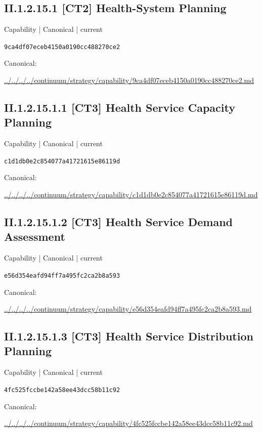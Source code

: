 \documentclass[10pt,a4paper]{article}
\begin{document}
\subsection*{II.1.2.15.1 [CT2] Health-System Planning}
\label{element-9ca4df07eceb4150a0190cc488270ce2}
{\small Capability | Canonical | current}\par
\texttt{9ca4df07eceb4150a0190cc488270ce2}\par
Canonical: \par
{\footnotesize\url{../../../../continuum/strategy/capability/9ca4df07eceb4150a0190cc488270ce2.md}}\par
\subsection*{II.1.2.15.1.1 [CT3] Health Service Capacity Planning}
\label{element-c1d1db0e2c854077a41721615e86119d}
{\small Capability | Canonical | current}\par
\texttt{c1d1db0e2c854077a41721615e86119d}\par
Canonical: \par
{\footnotesize\url{../../../../continuum/strategy/capability/c1d1db0e2c854077a41721615e86119d.md}}\par
\subsection*{II.1.2.15.1.2 [CT3] Health Service Demand Assessment}
\label{element-e56d354eafd94ff7a495fc2ca2b8a593}
{\small Capability | Canonical | current}\par
\texttt{e56d354eafd94ff7a495fc2ca2b8a593}\par
Canonical: \par
{\footnotesize\url{../../../../continuum/strategy/capability/e56d354eafd94ff7a495fc2ca2b8a593.md}}\par
\subsection*{II.1.2.15.1.3 [CT3] Health Service Distribution Planning}
\label{element-4fc525fccbe142a58ee43dcc58b11c92}
{\small Capability | Canonical | current}\par
\texttt{4fc525fccbe142a58ee43dcc58b11c92}\par
Canonical: \par
{\footnotesize\url{../../../../continuum/strategy/capability/4fc525fccbe142a58ee43dcc58b11c92.md}}\par
\end{document}
